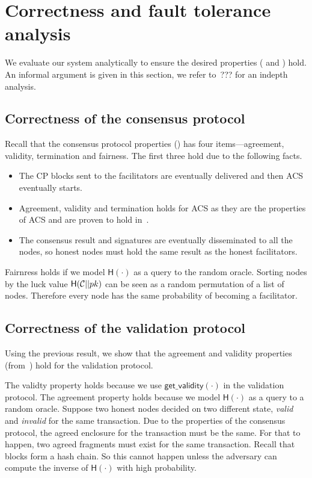 \section{Correctness and fault tolerance analysis}
\label{sec:analysis}
We evaluate our system analytically to ensure the desired properties ( and ) hold.
An informal argument is given in this section, we refer to~\cite[Chapter 4]{checo}??? for an indepth analysis.

\subsection{Correctness of the consensus protocol}
Recall that the consensus protocol properties () has
four items---agreement, validity, termination and fairness.
The first three hold due to the following facts.
\begin{itemize}
    \item The CP blocks sent to the facilitators are eventually delivered and then ACS eventually starts.
    \item Agreement, validity and termination holds for ACS as they are the properties of ACS and are proven to hold in~\cite{miller2016honey}.
    \item The consensus result and signatures are eventually disseminated to all the nodes,
        so honest nodes must hold the same result as the honest facilitators.
\end{itemize}

Fairnress holds if we model $\textsf{H}(\cdot)$ as a query to the random oracle.
Sorting nodes by the luck value $\textsf{H}(\mathcal{C} || pk)$ can be seen as a random permutation of a list of nodes.
Therefore every node has the same probability of becoming a facilitator.

\subsection{Correctness of the validation protocol}
\label{sec:correctness-of-validity}
Using the previous result,
we show that the agreement and validity properties (from~) hold for the validation protocol.

The validty property holds because we use $\textsf{get\_validity}(\cdot)$ in the validation protocol.
The agreement property holds because we model $\textsf{H}(\cdot)$ as a query to a random oracle.
Suppose two honest nodes decided on two different state, \emph{valid} and \emph{invalid} for the same transaction.
Due to the properties of the consensus protocol, the agreed enclosure for the transaction must be the same.
For that to happen, two agreed fragments must exist for the same transaction.
Recall that blocks form a hash chain.
So this cannot happen unless the adversary can compute the inverse of $\textsf{H}(\cdot)$ with high probability.

